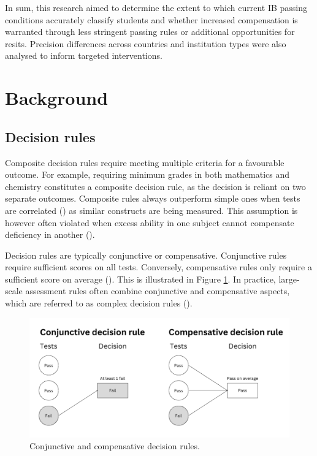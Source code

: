 \documentclass[12pt]{article}
\begin{document}
In sum, this research aimed to determine the extent to which current IB passing conditions accurately classify students and whether increased compensation is warranted through less stringent passing rules or additional opportunities for resits. Precision differences across countries and institution types were also analysed to inform targeted interventions.

\section{Background}

\subsection{Decision rules}

Composite decision rules require meeting multiple criteria for a favourable outcome. For example, requiring minimum grades in both mathematics and chemistry constitutes a composite decision rule, as the decision is reliant on two separate outcomes. Composite rules always outperform simple ones when tests are correlated (\cite{vermeulen-kerstensNominaalStuderenHet2012}) as similar constructs are being measured. This assumption is however often violated when excess ability in one subject cannot compensate deficiency in another (\cite{mehrensUsingCollegeGPA1989}).

Decision rules are typically conjunctive or compensative. Conjunctive rules require sufficient scores on all tests. Conversely, compensative rules only require a sufficient score on average (\cite{rijnEducationalMeasurementIssues2014}). This is illustrated in Figure \ref{fig:Decisions1}. 
In practice, large-scale assessment rules often combine conjunctive and compensative aspects, which are referred to as complex decision rules (\cite{douglasEstimatingClassificationAccuracy2010}).

\begin{figure}[htbp]
    \centering
    \includegraphics[scale=0.4]{Photos/Decision.jpg}
    \caption{Conjunctive and compensative decision rules.}
    \label{fig:Decisions1}
\end{figure}
\end{document}
